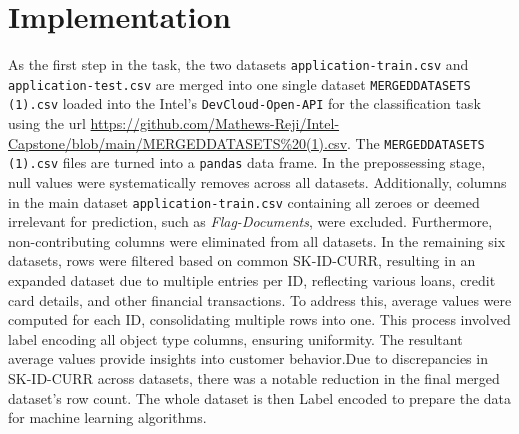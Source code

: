 \documentclass{josis}
\begin{document}
\section{Implementation}
As the first step in the task, the two datasets {\texttt{application-train.csv}} and {\texttt{application-test.csv}} are merged into one single dataset {\texttt{MERGEDDATASETS (1).csv}} loaded into  the Intel's {\texttt{DevCloud-Open-API}} for the classification task using the url \url{https://github.com/Mathews-Reji/Intel-Capstone/blob/main/MERGEDDATASETS%20(1).csv}. The {\texttt{MERGEDDATASETS (1).csv}} files are turned into a {\texttt{pandas}} data frame. In the prepossessing stage, null values were systematically removes across all datasets. Additionally, columns in the main dataset {\texttt{application-train.csv}} containing all zeroes or deemed irrelevant for prediction, such as {\em Flag-Documents}, were excluded. Furthermore, non-contributing columns were eliminated from all datasets. In the remaining six datasets, rows were filtered based on common SK-ID-CURR, resulting in an expanded dataset due to multiple entries per ID, reflecting various loans, credit card details, and other financial transactions. To address this, average values were computed for each ID, consolidating multiple rows into one. This process involved label encoding all object type columns, ensuring uniformity. The resultant average values provide insights into customer  behavior.Due to discrepancies in SK-ID-CURR across datasets, there was a notable reduction in the final merged dataset's row count. The whole dataset is then Label encoded to prepare the data for machine learning algorithms.
\end{document}
